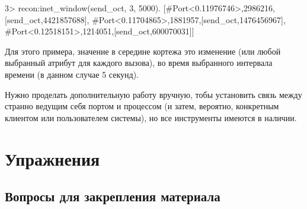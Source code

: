 \documentclass[11pt, oneside]{book}   	%
\newcommand{\ReviewTitle}{Вопросы для закрепления материала}
\begin{document}
\begin{VerbatimEshell}
3> recon:inet_window(send_oct, 3, 5000).
[{#Port<0.11976746>,2986216,[{send_oct,4421857688}]},
 {#Port<0.11704865>,1881957,[{send_oct,1476456967}]},
 {#Port<0.12518151>,1214051,[{send_oct,600070031}]}]
\end{VerbatimEshell}

Для этого примера, значение в середине кортежа это изменение  (или любой выбранный атрибут для каждого вызова), во время выбранного интервала времени (в данном случае 5 секунд).

Нужно проделать дополнительную работу вручную, тобы установить связь между странно ведущим себя портом и процессом (и затем, вероятно, конкретным клиентом или пользователем системы), но все инструменты имеются в наличии.


\section{Упражнения}

\subsection*{\ReviewTitle{}}
\end{document}
